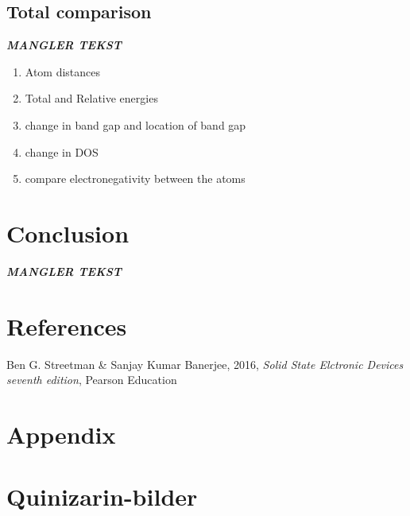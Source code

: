 \documentclass{article}
\begin{document}
  \subsection{Total comparison}

    \textbf{\textit{MANGLER TEKST}}

    \begin{enumerate}
        \item Atom distances
        \item Total and Relative energies
        \item change in band gap and location of band gap
        \item change in DOS
        \item compare electronegativity between the atoms
    \end{enumerate}




\vspace{1cm}

\section{Conclusion}    \label{sec:Conclusion}

  \textbf{\textit{MANGLER TEKST}}


\vspace{1cm}

\section{References} \label{sec:References}

    \begin{thebibliography}{}

    Ben G. Streetman \& Sanjay Kumar Banerjee, 2016, \textit{Solid State Elctronic Devices seventh edition}, Pearson Education


    \end{thebibliography}



\appendix

\section*{Appendix} \label{sec:Appendix}

\section{Quinizarin-bilder}
\end{document}
